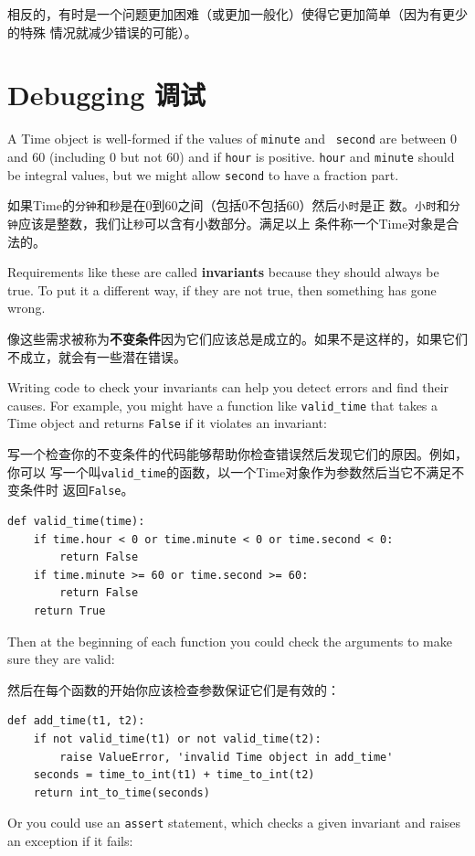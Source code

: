 \documentclass[10pt]{book}
\begin{document}
\begin{CJK}{UTF8}{gbsn}
相反的，有时是一个问题更加困难（或更加一般化）使得它更加简单（因为有更少的特殊
情况就减少错误的可能）。


\section{Debugging 调试}

A Time object is well-formed if the values of {\tt minute} and {\tt
second} are between 0 and 60 (including 0 but not 60) and if 
{\tt hour} is positive.  {\tt hour} and {\tt minute} should be
integral values, but we might allow {\tt second} to have a
fraction part.

如果Time的{\tt 分钟}和{\tt 秒}是在0到60之间（包括0不包括60）然后{\tt 小时}是正
数。{\tt 小时}和{\tt 分钟}应该是整数，我们让{\tt 秒}可以含有小数部分。满足以上
条件称一个Time对象是合法的。

Requirements like these are called {\bf invariants} because
they should always be true.  To put it a different way, if they
are not true, then something has gone wrong.

像这些需求被称为{\bf 不变条件}因为它们应该总是成立的。如果不是这样的，如果它们
不成立，就会有一些潜在错误。

Writing code to check your invariants can help you detect errors
and find their causes.  For example, you might have a function
like \verb"valid_time" that takes a Time object and returns
{\tt False} if it violates an invariant:

写一个检查你的不变条件的代码能够帮助你检查错误然后发现它们的原因。例如，你可以
写一个叫\verb"valid_time"的函数，以一个Time对象作为参数然后当它不满足不变条件时
返回{\tt False}。

\begin{verbatim}
def valid_time(time):
    if time.hour < 0 or time.minute < 0 or time.second < 0:
        return False
    if time.minute >= 60 or time.second >= 60:
        return False
    return True
\end{verbatim}
%
Then at the beginning of each function you could check the
arguments to make sure they are valid:

然后在每个函数的开始你应该检查参数保证它们是有效的：

\begin{verbatim}
def add_time(t1, t2):
    if not valid_time(t1) or not valid_time(t2):
        raise ValueError, 'invalid Time object in add_time'
    seconds = time_to_int(t1) + time_to_int(t2)
    return int_to_time(seconds)
\end{verbatim}
%
Or you could use an {\tt assert} statement, which checks a given invariant
and raises an exception if it fails:


\end{CJK}
\end{document}

